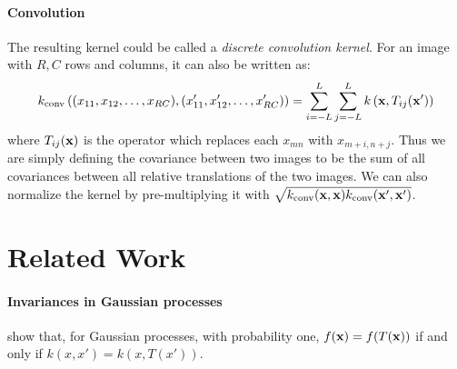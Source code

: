 \paragraph{Convolution} The resulting kernel could be called a \emph{discrete convolution kernel}.  For an image with $R, C$ rows and columns, it can also be written as:
%
\begin{align}
k_{\textnormal{conv}} \left( (x_{11}, x_{12}, \dots, x_{RC} ), (x_{11}', x_{12}', \dots, x_{RC}' ) \right) = %
\sum_{i=-L}^L \sum_{j=-L}^L k\left( \vx, T_{ij}(\vx') \right)
\end{align}
%
where $T_{ij}({\bf{x}})$ is the operator which replaces each $x_{mn}$ with $x_{m+i, n+j}$.  Thus we are simply defining the covariance between two images to be the sum of all covariances between all relative translations of the two images.  We can also normalize the kernel by pre-multiplying it with $\sqrt{k_{\textnormal{conv}}({\bf{x}}, {\bf{x}}) k_{\textnormal{conv}}({\bf{x}}', {\bf{x}}') }$.






\section{Related Work}
\label{sec:related_work}

\paragraph{Invariances in Gaussian processes}
\cite{Invariances13} show that, for Gaussian processes, with probability one, $f({\bf{x}}) = f(T({\bf{x}}))$ if and only if $k(x, x') = k(x, T(x'))$.








